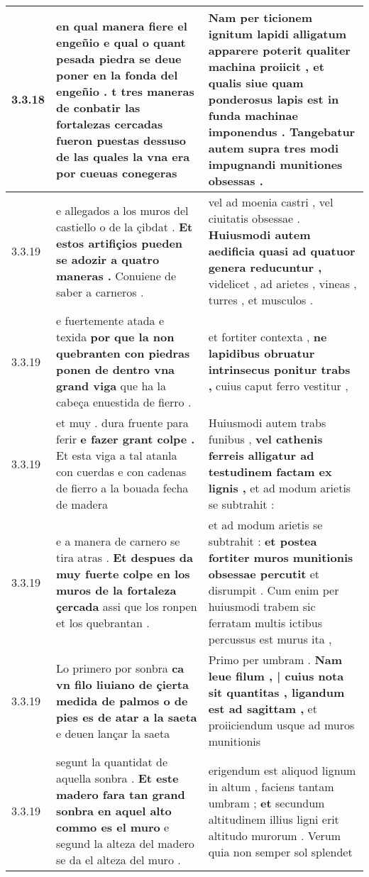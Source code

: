 \begin{tabular}{|p{1cm}|p{6.5cm}|p{6.5cm}|}
3.3.18 & en qual manera fiere el engeñio \textbf{ e qual o quant pesada piedra se deue poner en la fonda del engeñio . } t tres maneras de conbatir las fortalezas cercadas fueron puestas dessuso de las quales la vna era por cueuas conegeras & Nam per ticionem ignitum lapidi alligatum apparere poterit qualiter machina proiicit , \textbf{ et qualis siue quam ponderosus lapis est in funda machinae imponendus . } Tangebatur autem supra tres modi impugnandi munitiones obsessas . \\\hline
3.3.19 & e allegados a los muros del castiello o de la çibdat . \textbf{ Et estos artifiçios pueden se adozir a quatro maneras . } Conuiene de saber a carneros . & vel ad moenia castri , vel ciuitatis obsessae . \textbf{ Huiusmodi autem aedificia quasi ad quatuor genera reducuntur , } videlicet , ad arietes , vineas , turres , et musculos . \\\hline
3.3.19 & e fuertemente atada e texida \textbf{ por que la non quebranten con piedras ponen de dentro vna grand viga } que ha la cabeça enuestida de fierro . & et fortiter contexta , \textbf{ ne lapidibus obruatur intrinsecus ponitur trabs , } cuius caput ferro vestitur , \\\hline
3.3.19 & et muy . dura fruente para ferir \textbf{ e fazer grant colpe . } Et esta viga a tal atanla con cuerdas e con cadenas de fierro a la bouada fecha de madera & Huiusmodi autem trabs funibus , \textbf{ vel cathenis ferreis alligatur ad testudinem factam ex lignis , } et ad modum arietis se subtrahit : \\\hline
3.3.19 & e a manera de carnero se tira atras . \textbf{ Et despues da muy fuerte colpe en los muros de la fortaleza çercada } assi que los ronpen et los quebrantan . & et ad modum arietis se subtrahit : \textbf{ et postea fortiter muros munitionis obsessae percutit } et disrumpit . Cum enim per huiusmodi trabem sic ferratam multis ictibus percussus est murus ita , \\\hline
3.3.19 & Lo primero por sonbra \textbf{ ca vn filo liuiano de çierta medida de palmos o de pies es de atar a la saeta } e deuen lançar la saeta & Primo per umbram . \textbf{ Nam leue filum , | cuius nota sit quantitas , ligandum est ad sagittam , } et proiiciendum usque ad muros munitionis \\\hline
3.3.19 & segunt la quantidat de aquella sonbra . \textbf{ Et este madero fara tan grand sonbra en aquel alto commo es el muro } e segund la alteza del madero se da el alteza del muro . & erigendum est aliquod lignum in altum , faciens tantam umbram ; \textbf{ et } secundum altitudinem illius ligni erit altitudo murorum . Verum quia non semper sol splendet \\\hline

\end{tabular}
